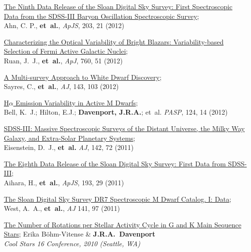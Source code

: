 \begin{etaremune}[leftmargin=10pt]
\item {\sc \href{http://adsabs.harvard.edu/abs/2012ApJS..203...21A}{\color{NavyBlue}The Ninth Data Release of the Sloan Digital Sky Survey: First Spectroscopic Data from the SDSS-III Baryon Oscillation Spectroscopic Survey}};\\
Ahn, C. P.,  {\bf et~al.}, {\em ApJS}, 203, 21 (2012)

\item {\sc \href{http://adsabs.harvard.edu/abs/2012ApJ...760...51R}{\color{NavyBlue}Characterizing the Optical Variability of Bright Blazars: Variability-based Selection of Fermi Active Galactic Nuclei}};\\
Ruan, J.~J., {\bf et~al.}, {\em ApJ}, 760, 51 (2012)

\item {\sc \href{http://adsabs.harvard.edu/abs/2012AJ....143..103S}{\color{NavyBlue}A Multi-survey Approach to White Dwarf Discovery}};\\
Sayres, C., {\bf et~al.}, {\em AJ}, 143, 103 (2012)

\item {\sc \href{http://adsabs.harvard.edu/abs/2012PASP..124...14B}{\color{NavyBlue}H$\alpha$ Emission Variability in Active M Dwarfs}};\\
Bell, K.~J.; Hilton, E.J.; {\bf Davenport, J.R.A.}; et~al. {\em PASP}, 124, 14 (2012)

\item {\sc \href{http://adsabs.harvard.edu/abs/2011AJ....142...72E}{\color{NavyBlue}SDSS-III: Massive Spectroscopic Surveys of the Distant Universe, the Milky Way Galaxy, and Extra-Solar Planetary Systems}};\\ 
Eisenstein, D.~J., {\bf et~al.} {\em AJ}, 142, 72 (2011)

\item {\sc \href{http://adsabs.harvard.edu/abs/2011ApJS..193...29A}{\color{NavyBlue}The Eighth Data Release of the Sloan Digital Sky Survey: First Data from SDSS-III}};\\
Aihara, H., {\bf et~al.}, {\em ApJS}, 193, 29 (2011)


\item {\sc \href{http://adsabs.harvard.edu/abs/2011AJ....141...97W}{\color{NavyBlue}The Sloan Digital Sky Survey DR7 Spectroscopic M Dwarf Catalog. I: Data}};\\
West, A.~A., {\bf et~al.}, {\em AJ} 141, 97 (2011)

\item{\sc\href{http://adsabs.harvard.edu/abs/2011ASPC..448.1077B}{\color{NavyBlue}The Number of Rotations per Stellar Activity Cycle in G and K Main Sequence Stars}};
Erika B\"ohm-Vitense \& {\bf J.R.A.~Davenport}\\
{\em Cool Stars 16 Conference, 2010 (Seattle, WA)}


\end{etaremune}
